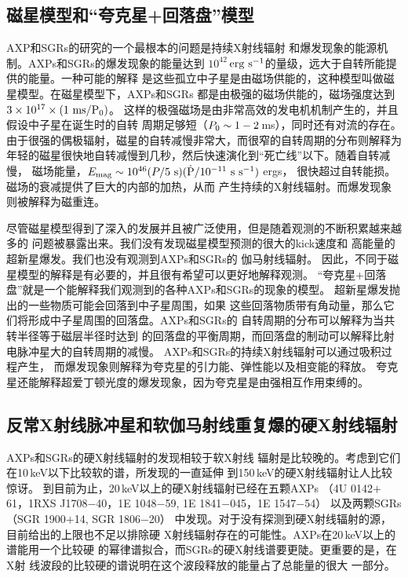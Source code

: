 \subsection{磁星模型和“夸克星+回落盘”模型}

AXP和SGRs的研究的一个最根本的问题是持续X射线辐射
和爆发现象的能源机制。AXPs和SGRs的爆发现象的能量达到
$10^{42}$\,$\rm{erg\ s^{-1}}$的量级，远大于自转所能提供的能量。一种可能的解释
是这些孤立中子星是由磁场供能的，这种模型叫做磁星模型。在磁星模型下，AXPs和SGRs
都是由极强的磁场供能的，磁场强度达到$3\times10^{17}\times(1\ \rm{ms}/P_{\rm{0}})$。
这样的极强磁场是由非常高效的发电机机制产生的，并且假设中子星在诞生时的自转
周期足够短（$P_{\rm{0}}\sim1-2$\,ms），同时还有对流的存在\supercite{td93}。
由于很强的偶极辐射，磁星的自转减慢非常大，而很窄的自转周期的分布则解释为
年轻的磁星很快地自转减慢到几秒，然后快速演化到“死亡线”以下。随着自转减慢，
磁场能量，$E_{\rm{mag}}\sim10^{46}(P/5\ \rm{s})(\dot P/10^{-11}\ \rm{s\ s^{-1}})$ ergs，
很快超过自转能损\supercite{m08}。磁场的衰减提供了巨大的内部的加热，从而
产生持续的X射线辐射。而爆发现象则被解释为磁重连\supercite{td93}。

尽管磁星模型得到了深入的发展并且被广泛使用，但是随着观测的不断积累越来越多的
问题被暴露出来。我们没有发现磁星模型预测的很大的kick速度\supercite{hcb+07}和
高能量的超新星爆发\supercite{gsg+01,vk06}。我们也没有观测到AXPs和SGRs的
伽马射线辐射\supercite{tsx11}。
%
因此，不同于磁星模型的解释是有必要的，并且很有希望可以更好地解释观测。
“夸克星+回落盘”就是一个能解释我们观测到的各种AXPs和SGRs的现象的模型。
超新星爆发抛出的一些物质可能会回落到中子星周围，如果
这些回落物质带有角动量，那么它们将形成中子星周围的回落盘。AXPs和SGRs的
自转周期的分布可以解释为当共转半径等于磁层半径时达到
的回落盘的平衡周期，而回落盘的制动可以解释比射电脉冲星大的自转周期的减慢\supercite{a01,chn00}。
AXPs和SGRs的持续X射线辐射可以通过吸积过程产生，
而爆发现象则解释为夸克星的引力能、弹性能以及相变能的释放\supercite{tx11}。
夸克星还能解释超爱丁顿光度的爆发现象，因为夸克星是由强相互作用束缚的。

\subsection{反常X射线脉冲星和软伽马射线重复爆的硬X射线辐射}

AXPs和SGRs的硬X射线辐射的发现相较于软X射线
辐射是比较晚的。考虑到它们在10\,keV以下比较软的谱，所发现的一直延伸
到150\,keV的硬X射线辐射让人比较惊讶\supercite{khm04,mcl+04,dhk+06}。
到目前为止，20\,keV以上的硬X射线辐射已经在五颗AXPs
（4U 0142$+$61，1RXS J1708$-$40，1E 1048$-$59, 1E 1841$-$045，1E 1547$-$54）\supercite{dhk+06,khd+06,lwr08,khm04,enm+10}
以及两颗SGRs（SGR 1900$+$14, SGR 1806$-$20）\supercite{gmt+06,emt+07}
中发现。对于没有探测到硬X射线辐射的源，目前给出的上限也不足以排除硬
X射线辐射存在的可能性。AXPs在20\,keV以上的谱能用一个比较硬
的幂律谱拟合，而SGRs的硬X射线谱要更陡。更重要的是，在X射
线波段的比较硬的谱说明在这个波段释放的能量占了总能量的很大
一部分\supercite{m08}。

